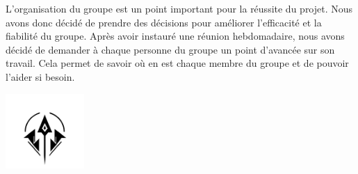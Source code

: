 L'organisation du groupe est un point important pour la réussite du projet.
Nous avons donc décidé de prendre des décisions pour améliorer l'efficacité et la fiabilité du groupe.
Après avoir instauré une réunion hebdomadaire, nous avons décidé de demander à chaque personne du groupe un point d'avancée sur son travail.
Cela permet de savoir où en est chaque membre du groupe et de pouvoir l'aider si besoin.


\centering
\vspace*{0.8cm}
\includegraphics[width=3cm]{format/logo.png}



